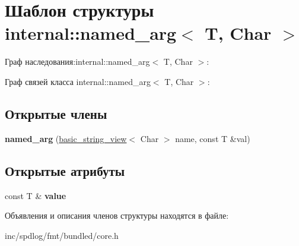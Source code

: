 \hypertarget{structinternal_1_1named__arg}{}\section{Шаблон структуры internal\+:\+:named\+\_\+arg$<$ T, Char $>$}
\label{structinternal_1_1named__arg}


Граф наследования\+:internal\+:\+:named\+\_\+arg$<$ T, Char $>$\+:


Граф связей класса internal\+:\+:named\+\_\+arg$<$ T, Char $>$\+:
\subsection*{Открытые члены}
\begin{DoxyCompactItemize}
\item 
\mbox{\label{structinternal_1_1named__arg_ada4a6386921114e321347031d2832969}} 
{\bfseries named\+\_\+arg} (\hyperlink{classbasic__string__view}{basic\+\_\+string\+\_\+view}$<$ Char $>$ name, const T \&val)
\end{DoxyCompactItemize}
\subsection*{Открытые атрибуты}
\begin{DoxyCompactItemize}
\item 
\mbox{\label{structinternal_1_1named__arg_aa97a74474c2c98dbcb5dbad098b6673b}} 
const T \& {\bfseries value}
\end{DoxyCompactItemize}


Объявления и описания членов структуры находятся в файле\+:\begin{DoxyCompactItemize}
\item 
inc/spdlog/fmt/bundled/core.\+h\end{DoxyCompactItemize}
